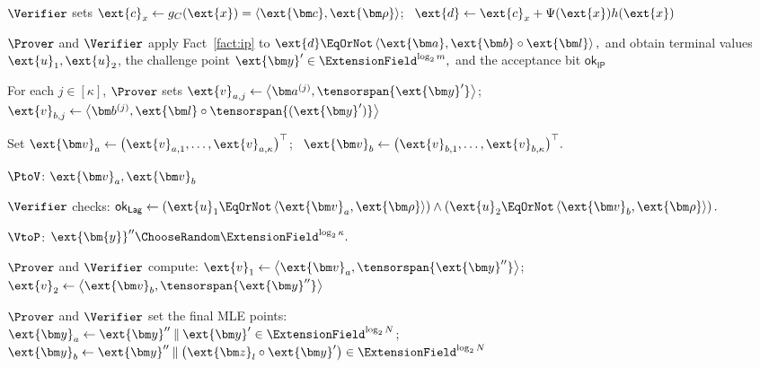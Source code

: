 \begin{algorithm}[!t]
\(\Verifier\) sets
\(
    \ext{c}_x
    \leftarrow
    g_C(\ext{x})
    =
    \left\langle
        \ext{\bm c},\ext{\bm\rho}
    \right\rangle
\);~
\(
    \ext{d}
    \leftarrow
    \ext{c}_x
    +
    \Psi(\ext{x})h(\ext{x})
\)\;

\(\Prover\) and \(\Verifier\) apply Fact~\ref{fact:ip} to
\(
    \ext{d}
    \EqOrNot
    \left\langle
        \ext{\bm a},
        \ext{\bm b}\circ\ext{\bm l}
    \right\rangle,
\)
and obtain terminal values
\(\ext{u}_1,\ext{u}_2\), the challenge point
\(
    \ext{\bm y}'
    \in\ExtensionField^{\log_2m},
\)
and the acceptance bit \(\mathsf{ok}_{\mathsf{IP}}\)\;

For each \(j\in[\kappa]\), \(\Prover\) sets
\(
    \ext{v}_{a,j}
    \leftarrow
    \left\langle
        \bm a^{(j)},
        \tensorspan{\ext{\bm y}'}
    \right\rangle
\);
\(
    \ext{v}_{b,j}
    \leftarrow
    \left\langle
        \bm b^{(j)},
        \ext{\bm l}
        \circ
        \tensorspan{(\ext{\bm y}')}
    \right\rangle
\)\;

Set
\(
    \ext{\bm v}_a
    \leftarrow
    \bigl(
        \ext{v}_{a,1},\ldots,\ext{v}_{a,\kappa}
    \bigr)^\top
\);~
\(
    \ext{\bm v}_b
    \leftarrow
    \bigl(
        \ext{v}_{b,1},\ldots,\ext{v}_{b,\kappa}
    \bigr)^\top.
\)

\(\PtoV\):
\(\ext{\bm v}_a,\ext{\bm v}_b\)\;

\(\Verifier\) checks:
\(
    \mathsf{ok}_{\mathsf{Lag}}
    \leftarrow
    \left(
        \ext{u}_1
        \EqOrNot
        \left\langle
            \ext{\bm v}_a,\ext{\bm\rho}
        \right\rangle
    \right)
    \wedge
    \left(
        \ext{u}_2
        \EqOrNot
        \left\langle
            \ext{\bm v}_b,\ext{\bm\rho}
        \right\rangle
    \right).
\)

\(\VtoP\):
\(
    \ext{\bm{y}}''
    \ChooseRandom
    \ExtensionField^{\log_2 \kappa}.
\)

\(\Prover\) and \(\Verifier\) compute:
\(
    \ext{v}_1
    \leftarrow
    \left\langle
        \ext{\bm v}_a,
        \tensorspan{\ext{\bm y}''}
    \right\rangle
\);~
\(
    \ext{v}_2
    \leftarrow
    \left\langle
        \ext{\bm v}_b,
        \tensorspan{\ext{\bm y}''}
    \right\rangle
\)\;

\(\Prover\) and \(\Verifier\) set the final MLE points:\\
\Indp
\(
    \ext{\bm y}_a
    \leftarrow
    \ext{\bm y}''
    \mathbin{\|}
    \ext{\bm y}'\in\ExtensionField^{\log_2N}
\);~
\(
    \ext{\bm y}_b
    \leftarrow
    \ext{\bm y}''
    \mathbin{\|}
    \left(
        \ext{\bm z}_l
        \circ
        \ext{\bm y}'
    \right)\in\ExtensionField^{\log_2N}
\)\;
\Indm


\end{algorithm}
